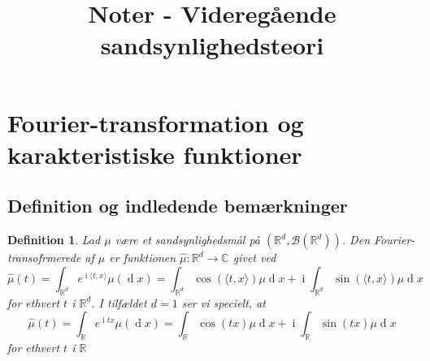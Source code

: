 \documentclass{article}
\title{Noter - Videregående sandsynlighedsteori}
\newcommand{\R}{\mathbb{R}}
\newcommand{\1}{\mathbbm{1}}
\theoremstyle{boxed}
\newtheorem{definition}[theorem]{Definition}
\begin{document}
\section{Fourier-transformation og karakteristiske funktioner}
\subsection{Definition og indledende bemærkninger}
\begin{theorem-box}
\begin{definition}
    Lad $\mu$ være et sandsynlighedsmål på $(\R^d, \mathcal{B}(\R^d))$. Den Fourier-transofrmerede af $\mu$ er funktionen $\hat{\mu}:\R^d\rightarrow \mathbb{C}$ givet ved 
    $$\hat{\mu}(t)=\int_{\R^d}e^{\operatorname{i}\langle t,x\rangle}\mu(\operatorname{d}x)=\int_{\R^d}\cos(\langle t,x\rangle)\mu \operatorname{d}x+\operatorname{i}\int_{\R^d}\sin(\langle t,x\rangle)\mu \operatorname{d}x$$
    for ethvert $t$ i $\R^d$. I tilfældet $d=1$ ser vi specielt, at 
    $$\hat{\mu}(t)=\int_{\R}e^{\operatorname{i}tx}\mu(\operatorname{d}x)=\int_{\R}\cos(tx)\mu \operatorname{d}x+\operatorname{i}\int_{\R}\sin(tx)\mu \operatorname{d}x$$
    for ethvert $t$ i $\R$
\end{definition}
\end{theorem-box}
\end{document}
